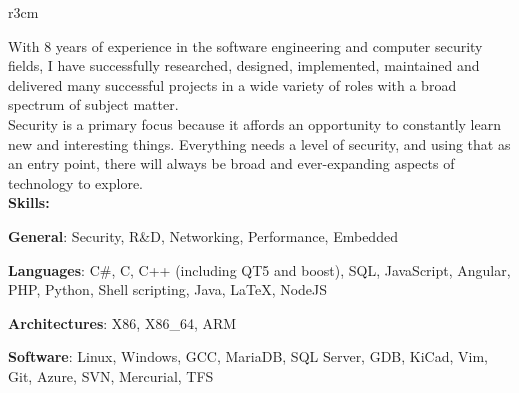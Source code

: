\documentclass[]{SBResume}
\begin{document}
\makeheader


\begin{resume}
  
  \begin{resumetext}
    \begin{wrapfigure}{r}{3cm}
    \insertheadshot
    \end{wrapfigure}
    With 8 years of experience in the software engineering and
    computer security fields, I have successfully researched,
    designed, implemented, maintained and delivered many successful
    projects in a wide variety of roles with a broad spectrum of
    subject matter.\\
    
    Security is a primary focus because it affords an opportunity to
    constantly learn new and interesting things. Everything needs a
    level of security, and using that as an entry point, there will
    always be broad and ever-expanding aspects of technology to
    explore.\\
    
    \textbf{Skills:}
    \begin{resumeitemize2}
    \item{\textbf{General}: Security, R\&D, Networking, Performance, Embedded}
    \item{\textbf{Languages}: C\#, C, C++ (including QT5 and boost), SQL, JavaScript, Angular, PHP, Python, Shell scripting, Java, \LaTeX, NodeJS}
    \item{\textbf{Architectures}: X86, X86\_64, ARM}
    \item{\textbf{Software}: Linux, Windows, GCC, MariaDB, SQL Server, GDB, KiCad, Vim, Git, Azure, SVN, Mercurial, TFS}
    \end{resumeitemize2}
    



\end{resumetext}
\end{resume}
\end{document}
